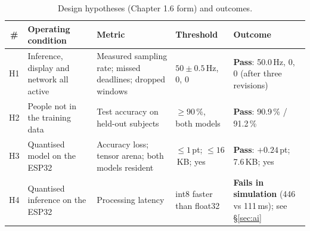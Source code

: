 \documentclass[10pt,a4paper]{article}
\begin{document}
\begin{table}[h]\small\centering
\caption{Design hypotheses (Chapter 1.6 form) and outcomes.}
\label{tab:hyp}
\begin{tabularx}{\textwidth}{@{}c L L L L@{}}
\toprule
\# & Operating condition & Metric & Threshold & Outcome \\
\midrule
H1 & Inference, display and network all active & Measured sampling rate; missed deadlines; dropped windows & $50\pm0.5$\,Hz, 0, 0 & \textbf{Pass}: 50.0\,Hz, 0, 0 (after three revisions) \\
H2 & People not in the training data & Test accuracy on held-out subjects & $\geq 90\,\%$, both models & \textbf{Pass}: 90.9\,\% / 91.2\,\% \\
H3 & Quantised model on the ESP32 & Accuracy loss; tensor arena; both models resident & $\leq 1$\,pt; $\leq 16$\,KB; yes & \textbf{Pass}: $+0.24$\,pt; 7.6\,KB; yes \\
H4 & Quantised inference on the ESP32 & Processing latency & int8 faster than float32 & \textbf{Fails in simulation} (446 vs 111\,ms); see \S\ref{sec:ai} \\
\bottomrule
\end{tabularx}
\end{table}
\end{document}
